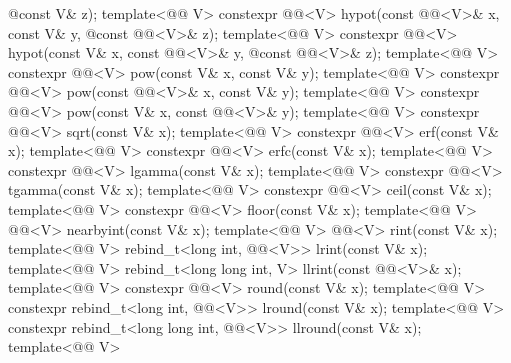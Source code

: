 \begin{codeblock}
{                                    @\itcorr@ const V& z);
  template<@@ V>
    constexpr @@<V> hypot(const @@<V>& x, const V& y,
                                    @\itcorr@ const @@<V>& z);
  template<@@ V>
    constexpr @@<V> hypot(const V& x, const @@<V>& y,
                                    @\itcorr@ const @@<V>& z);
  template<@@ V>
    constexpr @@<V> pow(const V& x, const V& y);
  template<@@ V>
    constexpr @@<V> pow(const @@<V>& x, const V& y);
  template<@@ V>
    constexpr @@<V> pow(const V& x, const @@<V>& y);
  template<@@ V> constexpr @@<V> sqrt(const V& x);
  template<@@ V> constexpr @@<V> erf(const V& x);
  template<@@ V> constexpr @@<V> erfc(const V& x);
  template<@@ V> constexpr @@<V> lgamma(const V& x);
  template<@@ V> constexpr @@<V> tgamma(const V& x);
  template<@@ V> constexpr @@<V> ceil(const V& x);
  template<@@ V> constexpr @@<V> floor(const V& x);
  template<@@ V> @@<V> nearbyint(const V& x);
  template<@@ V> @@<V> rint(const V& x);
  template<@@ V>
    rebind_t<long int, @@<V>> lrint(const V& x);
  template<@@ V>
    rebind_t<long long int, V> llrint(const @@<V>& x);
  template<@@ V>
    constexpr @@<V> round(const V& x);
  template<@@ V>
    constexpr rebind_t<long int, @@<V>> lround(const V& x);
  template<@@ V>
    constexpr rebind_t<long long int, @@<V>> llround(const V& x);
  template<@@ V>
}
\end{codeblock}
